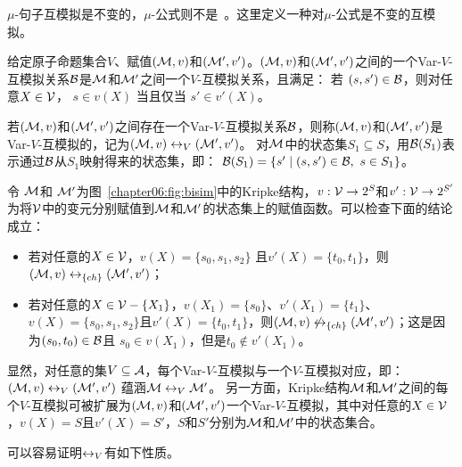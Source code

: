 $\mu$-句子互模拟是不变的，$\mu$-公式则不是~\cite{janin1996expressive}。这里定义一种对$\mu$-公式是不变的互模拟。
\begin{definition}
	\label{def:varVb}
	给定原子命题集合$V$、赋值$({\cal M}, v)$和$({\cal M}',v')$。$({\cal M}, v)$和$({\cal M}',v')$之间的一个Var-$V$-互模拟关系${\cal B}$是${\cal M}$和${\cal M}'$之间一个$V$-互模拟关系，且满足：
	若 $(s,s') \in {\cal B}$，则对任意$X\in {\cal V}$， $s\in v(X)$ 当且仅当 $s'\in v'(X)$。
\end{definition}

若$({\cal M}, v)$和$({\cal M}',v')$之间存在一个Var-$V$-互模拟关系${\cal B}$，则称$({\cal M}, v)$和$({\cal M}',v')$是Var-$V$-互模拟的，记为$({\cal M}, v)\leftrightarrow_V({\cal M}',v')$。
对${\cal M}$中的状态集$S_1\subseteq S$，用${\cal B}(S_1)$表示通过${\cal B}$从$S_1$映射得来的状态集，即： ${\cal B}(S_1) =\{s' \mid (s, s')\in {\cal B},\ s \in S_1\}$。

\begin{example}
	令 ${\cal M}$和 ${\cal M}'$为图~\ref{chapter06:fig:bisim}中的Kripke结构，$v: {\cal V} \rightarrow 2^S$和$v': {\cal V} \rightarrow 2^{S'}$为将${\cal V}$中的变元分别赋值到${\cal M}$和${\cal M}'$的状态集上的赋值函数。可以检查下面的结论成立：
	\begin{itemize}
		\item 若对任意的$X\in\cal V$，$v(X)= \{s_0, s_1, s_2\}$ 且$v'(X)=\{t_0, t_1\}$，则$({\cal M},v)\leftrightarrow_{\{ch\}} ({\cal M}',v')$；
		
		\item 若对任意的$X\in{\cal V}-\{X_1\}$，$v(X_1)= \{s_0\}$、$v'(X_1)=\{t_1\}$、$v(X)= \{s_0, s_1, s_2\}$且$v'(X)=\{t_0, t_1\}$，则$({\cal M},v)\not\leftrightarrow_{\{ch\}} ({\cal M}',v')$；这是因为$(s_0,t_0)\in {\cal B}$且 $s_0\in v(X_1)$，但是$t_0\notin v'(X_1)$。
	\end{itemize}
\end{example}

显然，对任意的集$V\subseteq {\cal A}$，每个Var-$V$-互模拟与一个$V$-互模拟对应，即：$({\cal M},v)\leftrightarrow_V({\cal M}',v')$ 蕴涵${\cal M}\leftrightarrow_V{\cal M}'$。
另一方面，Kripke结构${\cal M}$和${\cal M}'$之间的每个$V$-互模拟可被扩展为$({\cal M}, v)$和$({\cal M}',v')$一个Var-$V$-互模拟，其中对任意的$X\in {\cal V}$，$v(X) = S$且$v'(X) = S'$，$S$和$S'$分别为${\cal M}$和${\cal M}'$中的状态集合。

可以容易证明$\leftrightarrow_V$有如下性质。

